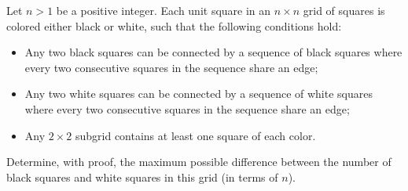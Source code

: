 Let $n>1$ be a positive integer. Each unit square in an $n \times n$ grid of squares is colored either black or white, such that the following conditions hold:
\begin{itemize}
	\item Any two black squares can be connected by a sequence of black squares where every two consecutive squares in the sequence share an edge;
	\item Any two white squares can be connected by a sequence of white squares where every two consecutive squares in the sequence share an edge;
	\item Any $2 \times 2$ subgrid contains at least one square of each color.
\end{itemize}
Determine, with proof, the maximum possible difference between the number of black squares and white squares in this grid (in terms of $n$).
